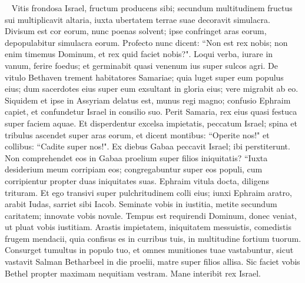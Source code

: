 \begin{biblechapter}   
\verse Vitis frondosa Israel, fructum producens sibi; secundum multitudinem fructus sui multiplicavit altaria, iuxta ubertatem terrae suae decoravit simulacra. 
\verse Divisum est cor eorum, nunc poenas solvent; ipse confringet aras eorum, depopulabitur simulacra eorum. 
\verse Profecto nunc dicent: “Non est rex nobis; non enim timemus Dominum, et rex quid faciet nobis?". 
\verse Loqui verba, iurare in vanum, ferire foedus; et germinabit quasi venenum ius super sulcos agri. 
\verse De vitulo Bethaven trement habitatores Samariae; quia luget super eum populus eius; dum sacerdotes eius super eum exsultant in gloria eius; vere migrabit ab eo. 
\verse Siquidem et ipse in Assyriam delatus est, munus regi magno; confusio Ephraim capiet, et confundetur Israel in consilio suo. 
\verse Perit Samaria, rex eius quasi festuca super faciem aquae. 
\verse Et disperdentur excelsa impietatis, peccatum Israel; spina et tribulus ascendet super aras eorum, et dicent montibus: “Operite nos!" et collibus: “Cadite super nos!". 
\verse Ex diebus Gabaa peccavit Israel; ibi perstiterunt. Non comprehendet eos in Gabaa proelium super filios iniquitatis? 
\verse “Iuxta desiderium meum corripiam eos; congregabuntur super eos populi, cum corripientur propter duas iniquitates suas. 
\verse Ephraim vitula docta, diligens trituram. Et ego transivi super pulchritudinem colli eius; iunxi Ephraim aratro, arabit Iudas, sarriet sibi Iacob. 
\verse Seminate vobis in iustitia, metite secundum caritatem; innovate vobis novale. Tempus est requirendi Dominum, donec veniat, ut pluat vobis iustitiam. 
\verse Arastis impietatem, iniquitatem messuistis, comedistis frugem mendacii, quia confisus es in curribus tuis, in multitudine fortium tuorum. 
\verse Consurget tumultus in populo tuo, et omnes munitiones tuae vastabuntur, sicut vastavit Salman Betharbeel in die proelii, matre super filios allisa. 
\verse Sic faciet vobis Bethel propter maximam nequitiam vestram. Mane interibit rex Israel. 
\end{biblechapter}

